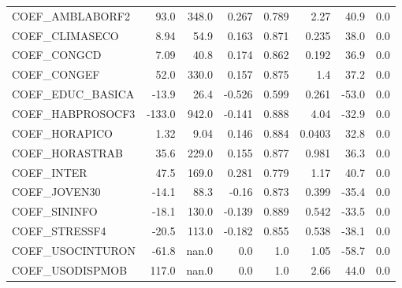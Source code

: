 \begin{tabular}{lrrrrrrr}
COEF\_AMBLABORF2  &   93.0 &    348.0 &   0.267 &    0.789 &          2.27 &         40.9 &           0.0 \\
COEF\_CLIMASECO   &   8.94 &     54.9 &   0.163 &    0.871 &         0.235 &         38.0 &           0.0 \\
COEF\_CONGCD      &   7.09 &     40.8 &   0.174 &    0.862 &         0.192 &         36.9 &           0.0 \\
COEF\_CONGEF      &   52.0 &    330.0 &   0.157 &    0.875 &           1.4 &         37.2 &           0.0 \\
COEF\_EDUC\_BASICA &  -13.9 &     26.4 &  -0.526 &    0.599 &         0.261 &        -53.0 &           0.0 \\
COEF\_HABPROSOCF3 & -133.0 &    942.0 &  -0.141 &    0.888 &          4.04 &        -32.9 &           0.0 \\
COEF\_HORAPICO    &   1.32 &     9.04 &   0.146 &    0.884 &        0.0403 &         32.8 &           0.0 \\
COEF\_HORASTRAB   &   35.6 &    229.0 &   0.155 &    0.877 &         0.981 &         36.3 &           0.0 \\
COEF\_INTER       &   47.5 &    169.0 &   0.281 &    0.779 &          1.17 &         40.7 &           0.0 \\
COEF\_JOVEN30     &  -14.1 &     88.3 &   -0.16 &    0.873 &         0.399 &        -35.4 &           0.0 \\
COEF\_SININFO     &  -18.1 &    130.0 &  -0.139 &    0.889 &         0.542 &        -33.5 &           0.0 \\
COEF\_STRESSF4    &  -20.5 &    113.0 &  -0.182 &    0.855 &         0.538 &        -38.1 &           0.0 \\
COEF\_USOCINTURON &  -61.8 &    nan.0 &     0.0 &      1.0 &          1.05 &        -58.7 &           0.0 \\
COEF\_USODISPMOB  &  117.0 &    nan.0 &     0.0 &      1.0 &          2.66 &         44.0 &           0.0 \\
\bottomrule
\end{tabular}

